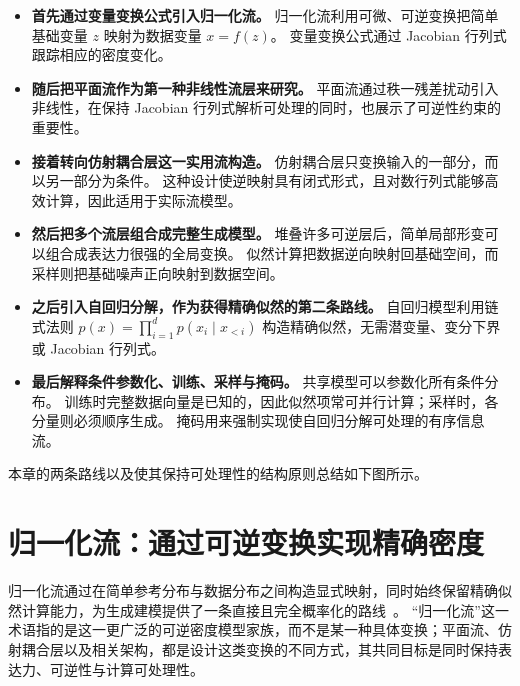 \begin{itemize}
    \item[\(\rightarrow\)] \textbf{首先通过变量变换公式引入归一化流。}
    归一化流利用可微、可逆变换把简单基础变量 $z$ 映射为数据变量 $x=f(z)$。
    变量变换公式通过 Jacobian 行列式跟踪相应的密度变化。

    \item[\(\rightarrow\)] \textbf{随后把平面流作为第一种非线性流层来研究。}
    平面流通过秩一残差扰动引入非线性，在保持 Jacobian 行列式解析可处理的同时，也展示了可逆性约束的重要性。

    \item[\(\rightarrow\)] \textbf{接着转向仿射耦合层这一实用流构造。}
    仿射耦合层只变换输入的一部分，而以另一部分为条件。
    这种设计使逆映射具有闭式形式，且对数行列式能够高效计算，因此适用于实际流模型。

    \item[\(\rightarrow\)] \textbf{然后把多个流层组合成完整生成模型。}
    堆叠许多可逆层后，简单局部形变可以组合成表达力很强的全局变换。
    似然计算把数据逆向映射回基础空间，而采样则把基础噪声正向映射到数据空间。

    \item[\(\rightarrow\)] \textbf{之后引入自回归分解，作为获得精确似然的第二条路线。}
    自回归模型利用链式法则
    $p(x)=\prod_{i=1}^d p(x_i\mid x_{<i})$
    构造精确似然，无需潜变量、变分下界或 Jacobian 行列式。

    \item[\(\rightarrow\)] \textbf{最后解释条件参数化、训练、采样与掩码。}
    共享模型可以参数化所有条件分布。
    训练时完整数据向量是已知的，因此似然项常可并行计算；采样时，各分量则必须顺序生成。
    掩码用来强制实现使自回归分解可处理的有序信息流。
\end{itemize}

本章的两条路线以及使其保持可处理性的结构原则总结如下图所示。



\section{归一化流：通过可逆变换实现精确密度}

归一化流通过在简单参考分布与数据分布之间构造显式映射，同时始终保留精确似然计算能力，为生成建模提供了一条直接且完全概率化的路线~\cite{rezende2015variational}。
“归一化流”这一术语指的是这一更广泛的可逆密度模型家族，而不是某一种具体变换；平面流、仿射耦合层以及相关架构，都是设计这类变换的不同方式，其共同目标是同时保持表达力、可逆性与计算可处理性。

